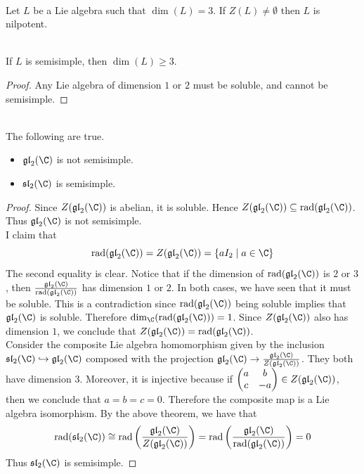 \documentclass[a4paper]{article}
\begin{document}
\begin{lmm}{}{} \\Let $L$ be a Lie algebra such that $\dim(L)=3$. If $Z(L)\neq\emptyset$ then $L$ is nilpotent. 
\end{lmm}

\begin{lmm}{}{}\\If $L$ is semisimple, then $\dim(L)\geq 3$. 
\begin{proof}
Any Lie algebra of dimension $1$ or $2$ must be soluble, and cannot be semisimple. 
\end{proof}
\end{lmm}

\begin{eg}{}{} \\The following are true. 
\begin{itemize}
\item $\mathfrak{gl}_2(\C)$ is not semisimple. 
\item $\mathfrak{sl}_2(\C)$ is semisimple. 
\end{itemize} 
\begin{proof}
Since $Z(\mathfrak{gl}_2(\C))$ is abelian, it is soluble. Hence $Z(\mathfrak{gl}_2(\C))\subseteq\text{rad}(\mathfrak{gl}_2(\C))$. Thus $\mathfrak{gl}_2(\C)$ is not semisimple. \\

I claim that $$\text{rad}(\mathfrak{gl}_2(\C))=Z(\mathfrak{gl}_2(\C))=\{aI_2\;|\;a\in\C\}$$ The second equality is clear. Notice that if the dimension of $\text{rad}(\mathfrak{gl}_2(\C))$ is $2$ or $3$, then $\frac{\mathfrak{gl}_2(\C)}{\text{rad}(\mathfrak{gl}_2(\C))}$ has dimension $1$ or $2$. In both cases, we have seen that it must be soluble. This is a contradiction since $\text{rad}(\mathfrak{gl}_2(\C))$ being soluble implies that $\mathfrak{gl}_2(\C)$ is soluble. Therefore $\dim_\C(\text{rad}(\mathfrak{gl}_2(\C)))=1$. Since $Z(\mathfrak{gl}_2(\C))$ also has dimension $1$, we conclude that $Z(\mathfrak{gl}_2(\C))=\text{rad}(\mathfrak{gl}_2(\C))$. \\

Consider the composite Lie algebra homomorphism given by the inclusion $\mathfrak{sl}_2(\C)\hookrightarrow\mathfrak{gl}_2(\C)$ composed with the projection $\mathfrak{gl}_2(\C)\to\frac{\mathfrak{gl}_2(\C)}{Z(\mathfrak{gl}_2(\C))}$. They both have dimension $3$. Moreover, it is injective because if $\begin{pmatrix}
a & b\\
c & -a
\end{pmatrix}\in Z(\mathfrak{gl}_2(\C))$, then we conclude that $a=b=c=0$. Therefore the composite map is a Lie algebra isomorphism. By the above theorem, we have that $$\text{rad}(\mathfrak{sl}_2(\C))\cong\text{rad}\left(\frac{\mathfrak{gl}_2(\C)}{Z(\mathfrak{gl}_2(\C))}\right)=\text{rad}\left(\frac{\mathfrak{gl}_2(\C)}{\text{rad}(\mathfrak{gl}_2(\C))}\right)=0$$ Thus $\mathfrak{sl}_2(\C)$ is semisimple. 
\end{proof}
\end{eg}
\end{document}
